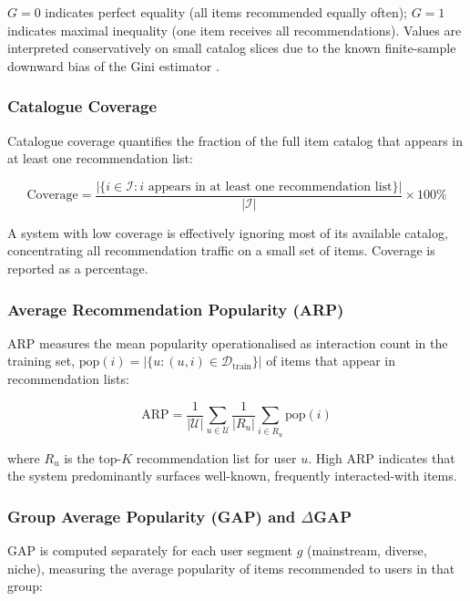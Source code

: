 \documentclass[11pt,a4paper]{report}
\begin{document}
$G = 0$ indicates perfect equality (all items recommended equally often); $G = 1$ indicates maximal inequality (one item receives all recommendations). Values are interpreted conservatively on small catalog slices due to the known finite-sample downward bias of the Gini estimator \citep{deltas2003gini}.

\subsubsection*{Catalogue Coverage}

Catalogue coverage quantifies the fraction of the full item catalog that appears in at least one recommendation list:

\begin{equation}
\textrm{Coverage} = \frac{\bigl|\{i \in \mathcal{I} : i \text{ appears in at least one recommendation list}\}\bigr|}{|\mathcal{I}|} \times 100\%
\end{equation}

A system with low coverage is effectively ignoring most of its available catalog, concentrating all recommendation traffic on a small set of items. Coverage is reported as a percentage.

\subsubsection*{Average Recommendation Popularity (ARP)}

ARP measures the mean popularity operationalised as interaction count in the training set, $\text{pop}(i) = |\{u : (u,i) \in \mathcal{D}_\text{train}\}|$ of items that appear in recommendation lists:

\begin{equation}
\textrm{ARP} = \frac{1}{|\mathcal{U}|}\sum_{u \in \mathcal{U}} \frac{1}{|R_u|}\sum_{i \in R_u} \textrm{pop}(i)
\end{equation}

where $R_u$ is the top-$K$ recommendation list for user $u$. High ARP indicates that the system predominantly surfaces well-known, frequently interacted-with items.

\subsubsection*{Group Average Popularity (GAP) and $\Delta$GAP}

GAP is computed separately for each user segment $g$ (mainstream, diverse, niche), measuring the average popularity of items recommended to users in that group:
\end{document}
